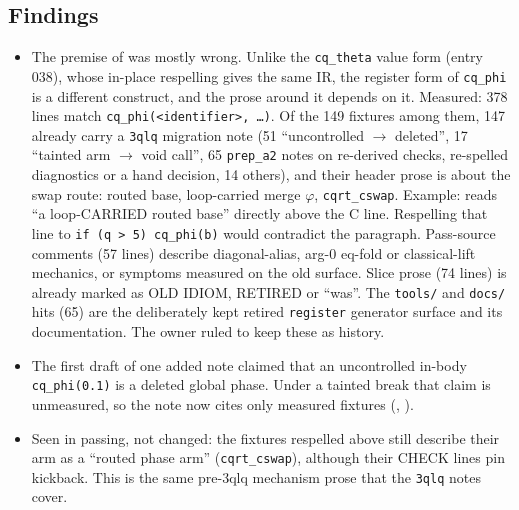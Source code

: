 \subsection*{Findings}
\begin{itemize}
  \item The premise of  was mostly wrong. Unlike the
  \texttt{cq\_theta} value form (entry 038), whose in-place respelling gives the same IR,
  the register form of \texttt{cq\_phi} is a different construct, and the prose around it
  depends on it. Measured: 378 lines match
  \texttt{cq\_phi(<identifier>, \ldots)}. Of the 149 fixtures among them, 147 already
  carry a \texttt{3qlq} migration note (51 ``uncontrolled $\to$ deleted'', 17 ``tainted
  arm $\to$ void call'', 65 \texttt{prep\_a2} notes on re-derived checks, re-spelled
  diagnostics or a hand decision, 14 others), and their header
  prose is about the swap route: routed base, loop-carried merge $\varphi$,
  \texttt{cqrt\_cswap}. Example:  reads ``a
  loop-CARRIED routed base'' directly above the C line. Respelling that line to
  \texttt{if (q > 5) cq\_phi(b)} would contradict the paragraph. Pass-source comments (57
  lines) describe diagonal-alias, arg-0 eq-fold or classical-lift mechanics, or symptoms
  measured on the old surface. Slice prose (74 lines) is already marked as OLD IDIOM,
  RETIRED or ``was''. The \texttt{tools/} and \texttt{docs/} hits (65) are the deliberately
  kept retired \texttt{register} generator surface and its documentation. The owner ruled
  to keep these as history.
  \item The first draft of one added note claimed that an uncontrolled in-body
  \texttt{cq\_phi(0.1)} is a deleted global phase. Under a tainted break that claim is
  unmeasured, so the note now cites only measured fixtures
  (,
  ).
  \item Seen in passing, not changed: the fixtures respelled above still describe their
  arm as a ``routed phase arm'' (\texttt{cqrt\_cswap}), although their CHECK lines pin
  kickback. This is the same pre-3qlq mechanism prose that the \texttt{3qlq} notes cover.
\end{itemize}

